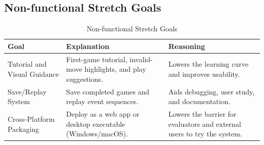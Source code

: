 \documentclass{article}
\begin{document}
    \subsection{Non-functional Stretch Goals}
    \begin{table}[H]
        \caption{Non-functional Stretch Goals}\label{TblStretchNonFunctionalGoals}
        \begin{tabular}{|p{}|p{}|p{}|}
            \hline
            \textbf{Goal} & \textbf{Explanation} & \textbf{Reasoning} \\
            \hline
            Tutorial and Visual Guidance &
            First-game tutorial, invalid-move highlights, and play suggestions. &
            Lowers the learning curve and improves usability. \\
            \hline
            Save/Replay System &
            Save completed games and replay event sequences. &
            Aids debugging, user study, and documentation. \\
            \hline
            Cross-Platform Packaging &
            Deploy as a web app or desktop executable (Windows/macOS). &
            Lowers the barrier for evaluators and external users to try the system. \\
            \hline
        \end{tabular}
    \end{table}
\end{document}
